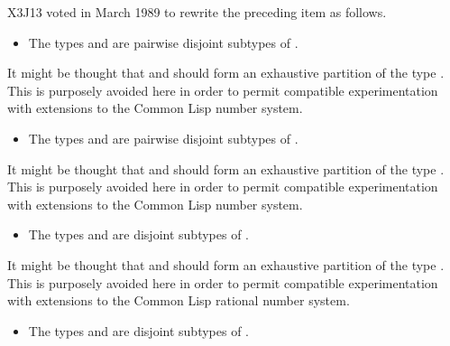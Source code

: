 {\begin{newer}
X3J13 voted in March 1989  to rewrite the preceding item
as follows.
\begin{itemize}
\item
The types  and  are pairwise disjoint
subtypes of .
\end{itemize}

\beforenoterule
\begin{rationale}
It might be thought that  and  should
form an exhaustive partition of the type .  This is purposely
avoided here in order to permit compatible experimentation with extensions
to the Common Lisp number system.
\end{rationale}
\afternoterule

\begin{itemize}
\item
The types  and  are pairwise disjoint
subtypes of .
\end{itemize}

\beforenoterule
\begin{rationale}
It might be thought that  and  should
form an exhaustive partition of the type .  This is purposely
avoided here in order to permit compatible experimentation with extensions
to the Common Lisp number system.
\end{rationale}
\afternoterule
\end{newer}

\begin{itemize}
\item
The types  and  are disjoint subtypes of .
\end{itemize}

\beforenoterule
\begin{rationale}
It might be thought that  and  should
form an exhaustive partition of the type .  This is purposely
avoided here in order to permit compatible experimentation with extensions
to the Common Lisp rational number system.
\end{rationale}
\afternoterule

\begin{obsolete}
\begin{itemize}
\item
The types  and  are disjoint subtypes of .
\end{itemize}


\end{obsolete}}
